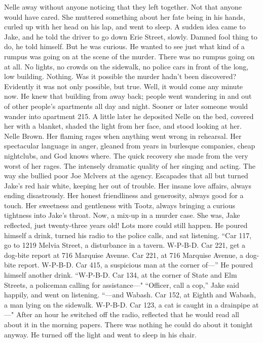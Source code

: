 \documentclass{novel}
\begin{document}
Nelle away without anyone noticing that they left together. Not that anyone would have cared. She muttered something about her fate being in his hands, curled up with her head on his lap, and went to sleep. A sudden idea came to Jake, and he told the driver to go down Erie Street, slowly. Damned fool thing to do, he told himself. But he was curious. He wanted to see just what kind of a rumpus was going on at the scene of the murder. There was no rumpus going on at all. No lights, no crowds on the sidewalk, no police cars in front of the long, low building. Nothing. Was it possible the murder hadn’t been discovered? Evidently it was not only possible, but true. Well, it would come any minute now. He knew that building from away back; people went wandering in and out of other people’s apartments all day and night. Sooner or later someone would wander into apartment 215. A little later he deposited Nelle on the bed, covered her with a blanket, shaded the light from her face, and stood looking at her. Nelle Brown. Her flaming rages when anything went wrong in rehearsal. Her spectacular language in anger, gleaned from years in burlesque companies, cheap nightclubs, and God knows where. The quick recovery she made from the very worst of her rages. The intensely dramatic quality of her singing and acting. The way she bullied poor Joe Mclvers at the agency. Escapades that all but turned Jake’s red hair white, keeping her out of trouble. Her insane love affairs, always ending disastrously. Her honest friendliness and generosity, always good for a touch. Her sweetness and gentleness with Tootz, always bringing a curious tightness into Jake’s throat. Now, a mix-up in a murder case. She was, Jake reflected, just twenty-three years old! Lots more could still happen. He poured himself a drink, turned his radio to the police calls, and sat listening. “Car 117, go to 1219 Melvia Street, a disturbance in a tavern. W-P-B-D. Car 221, get a dog-bite report at 716 Marquise Avenue. Car 221, at 716 Marquise Avenue, a dog-bite report. W-P-B-D. Car 415, a suspicious man at the corner of—” He poured himself another drink. “W-P-B-D. Car 134, at the corner of State and Elm Streets, a policeman calling for assistance—" “Officer, call a cop,” Jake said happily, and went on listening. “—and Wabash. Car 152, at Eighth and Wabash, a man lying on the sidewalk. W-P-B-D. Car 123, a cat is caught in a drainpipe at—" After an hour he switched off the radio, reflected that he would read all about it in the morning papers. There was nothing he could do about it tonight anyway. He turned off the light and went to sleep in his chair.
\end{document}

